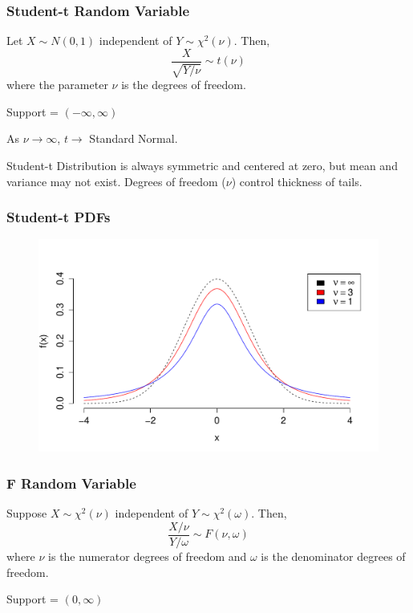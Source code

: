 \documentclass[handout]{beamer}
\begin{document}

\begin{frame}
\frametitle{Student-t Random Variable}
Let $X \sim N(0,1)$ independent of $Y \sim \chi^2(\nu)$. Then,
$$\frac{X}{\sqrt{Y/\nu}}\sim t(\nu)$$
where the parameter $\nu$ is the degrees of freedom.

\vspace{1em}

\alert{Support = $(-\infty, \infty)$}

\vspace{1em}

\alert{As $\nu \rightarrow \infty$, $t \rightarrow$ Standard Normal.}\\
\vspace{2em}

\alert{Student-t Distribution is always symmetric and centered at zero, but mean and variance may  not exist. Degrees of freedom ($\nu$) control thickness of tails.}
\end{frame}



\begin{frame}
\frametitle{Student-t PDFs}

\begin{figure}
\includegraphics[scale = 0.58]{./images/tpdf}
\end{figure}
\end{frame}

\begin{frame}
\frametitle{F Random Variable}
Suppose $X \sim \chi^2(\nu)$ independent of $Y \sim \chi^2(\omega)$. Then,
	$$\frac{X/\nu}{Y/\omega} \sim F(\nu, \omega)$$
where $\nu$ is the numerator degrees of freedom and $\omega$ is the denominator degrees of freedom.
\vspace{1em}

\pause
\alert{Support = $(0, \infty)$}\\

\end{frame}
\end{document}
